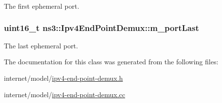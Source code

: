 The first ephemeral port. 

\subsubsection[{\texorpdfstring{m\+\_\+port\+Last}{m_portLast}}]{\setlength{\rightskip}{0pt plus 5cm}uint16\+\_\+t ns3\+::\+Ipv4\+End\+Point\+Demux\+::m\+\_\+port\+Last\hspace{0.3cm}{\ttfamily [private]}}\hypertarget{classns3_1_1Ipv4EndPointDemux_a3f18b7e91d6413f04a591b1e2ca7b02f}{}\label{classns3_1_1Ipv4EndPointDemux_a3f18b7e91d6413f04a591b1e2ca7b02f}


The last ephemeral port. 



The documentation for this class was generated from the following files\+:\begin{DoxyCompactItemize}
\item 
internet/model/\hyperlink{ipv4-end-point-demux_8h}{ipv4-\/end-\/point-\/demux.\+h}\item 
internet/model/\hyperlink{ipv4-end-point-demux_8cc}{ipv4-\/end-\/point-\/demux.\+cc}\end{DoxyCompactItemize}
